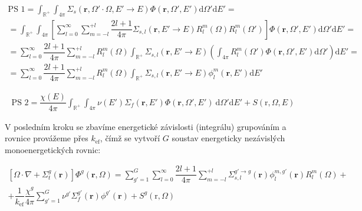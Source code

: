 \begin{equation*}
  \begin{multlined}
    \text{PS 1} = \int_\mathbb{R^+} \int_{4 \pi} \Sigma_s(\textbf{r}, \Omega' \cdot \Omega, E' \rightarrow E) \Phi(\textbf{r}, \Omega', E') \text{d}\Omega' \text{d}E' = \\
    = \int_\mathbb{R^+} \int_{4 \pi} \left [ \sum_{l=0}^{\infty} \sum_{m=-l}^{+l} \dfrac{2l + 1}{4 \pi} \Sigma_{s,l}(\textbf{r}, E' \rightarrow E) R_l^m(\Omega) R_l^m(\Omega') \right ] \Phi(\textbf{r}, \Omega', E') \text{d}\Omega' \text{d}E' = \\
    = \sum_{l=0}^{\infty} \dfrac{2l + 1}{4 \pi} \sum_{m=-l}^{+l} R_l^m(\Omega) \int_\mathbb{R^+} \Sigma_{s,l}(\textbf{r}, E' \rightarrow E) \left ( \int_{4 \pi} R_l^m(\Omega') \Phi(\textbf{r}, \Omega', E') \text{d}\Omega' \right ) \text{d}E' =\\
    = \sum_{l=0}^{\infty} \dfrac{2l + 1}{4 \pi} \sum_{m=-l}^{+l} R_l^m(\Omega) \int_\mathbb{R^+} \Sigma_{s,l}(\textbf{r}, E' \rightarrow E) \phi_l^m(\textbf{r}, E') \text{d}E'
  \end{multlined}
\end{equation*}

\begin{equation*}
  \begin{multlined}
    \text{PS 2} = \dfrac{\chi(E)}{4\pi} \int_\mathbb{R^+} \int_{4\pi} \nu(E') \Sigma_f(\textbf{r}, E') \Phi(\textbf{r}, \Omega', E') \: \text{d}\Omega' \text{d}E' + S(\text{r},\Omega,E)
  \end{multlined}
\end{equation*}

V posledním kroku se zbavíme energetické závislosti (integrálu) grupováním a rovnice provážeme přes $k_\text{ef}$, čímž se vytvoří $G$ soustav energeticky nezávislých monoenergetických rovnic:

\begin{equation*}
  \boxed{
  \begin{multlined}
    \left[ \Omega \cdot \nabla + \Sigma_t^g(\textbf{r}) \right] \Phi^g(\textbf{r}, \Omega) = \sum_{g'=1}^{G} \sum_{l=0}^{\infty} \dfrac{2l+1}{4\pi} \sum_{m=-l}^{+l} \Sigma_{s,l}^{g' \to g}(\textbf{r}) \phi_l^{m,g'}(\textbf{r}) R_l^m(\Omega) + \\
    + \dfrac{1}{k_\text{ef}} \dfrac{\chi^g}{4\pi} \sum_{g'=1}^{G} \nu^{g'} \Sigma_f^{g'}(\textbf{r}) \phi^{g'}(\textbf{r}) + S^g(\text{r},\Omega)
  \end{multlined}}
\end{equation*}

